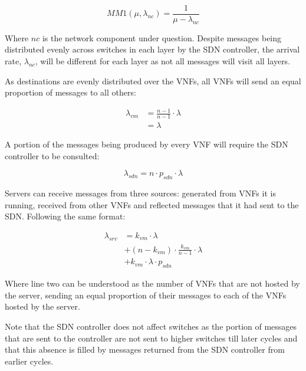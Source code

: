 \begin{equation}
\label{eq:MM1_time_in_network}
MM1(\mu, \lambda_{nc}) = \frac{1}{\mu - \lambda_{nc}}
\end{equation}

Where $nc$ is the network component under question. Despite messages being distributed evenly across switches in each layer by the SDN controller, the arrival rate, $\lambda_{nc}$, will be different for each layer as not all messages will visit all layers.

As destinations are evenly distributed over the VNFs, all VNFs will send an equal proportion of messages to all others:

\begin{equation}
\label{eq:arr_vnf}
\begin{split}
\lambda_{vm} &= \frac{n - 1}{n - 1} \cdot \lambda \\
			 &= \lambda
\end{split}
\end{equation}

A portion of the messages being produced by every VNF will require the SDN controller to be consulted:

\begin{equation}
\label{eq:arr_sdn}
\lambda_{sdn} = n \cdot p_{sdn} \cdot \lambda
\end{equation}

Servers can receive messages from three sources: generated from VNFs it is running, received from other VNFs and reflected messages that it had sent to the SDN. Following the same format:

\begin{equation}
\label{eq:arr_srv}
\begin{split}
\lambda_{srv} &= k_{vm} \cdot \lambda \\
			  &+ (n - k_{vm}) \cdot  \frac{k_{vm}}{n - 1} \cdot \lambda \\
			  &+ k_{vm} \cdot \lambda \cdot p_{sdn}
\end{split}
\end{equation}

Where line two can be understood as the number of VNFs that are not hosted by the server, sending an equal proportion of their messages to each of the VNFs hosted by the server.

Note that the SDN controller does not affect switches as the portion of messages that are sent to the controller are not sent to higher switches till later cycles and that this absence is filled by messages returned from the SDN controller from earlier cycles. 

